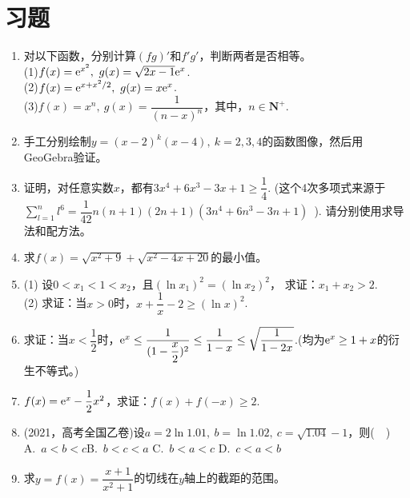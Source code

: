 
\section{习题} 
\begin{enumerate}[label={\textbf{\arabic*.}},leftmargin=
    \inteval{\myenumleftmargin}pt]
\item 对以下函数，分别计算$ (fg)' $和$ f'g' $，判断两者是否相等。\\
(1)$ f(x)=\e^{x^2},\ g(x)=\sqrt{2x-1}\e^x $.\\
(2)$ f(x)=\e^{x+x^2/2},\ g(x)=x\e^x $. \\
(3)$ f(x)=x^n,\ g(x)=\dfrac{1}{(n-x)^n} $，其中，$ n\in \textbf{N}^+ $.

\item 手工分别绘制$ y=(x-2)^k(x-4),\ k=2,3,4 $的函数图像，然后用GeoGebra验证。

\item 证明，对任意实数$ x $，都有$ 3x^4+6x^3-3x+1\geq \dfrac{1}{4} $.
(这个4次多项式来源于$ \sum\limits_{l=1}^{n} l^6=
\dfrac{1}{42}n(n+1)(2n+1)(3n^4+6n^3-3n+1) $\ ). 
请分别使用求导法和配方法。

\item 求$ f(x)=\sqrt{x^2+9}+\sqrt{x^2-4x+20} $的最小值。

\item 
(1) 设$ 0<x_1<1<x_2 $，且$ (\ln x_1)^2=(\ln x_2)^2 $，
求证：$ x_1+x_2>2 $. \\
(2) 求证：当$x>0$时，$ x+\dfrac{1}{x}-2\geq (\ln x)^2 $. 

\item 求证：当$ x<\dfrac{1}{2} $时，$ \mathrm{e}^x\leq \dfrac{1}{(1-\dfrac{x}{2})^2}
\leq \dfrac{1}{1-x}\leq \sqrt{\dfrac{1}{1-2x}} $.(均为$ \mathrm{e}^x\geq 1+x $的衍生不等式。)

\item $ f(x)=\mathrm{e}^x-\dfrac{1}{2}x^2 $，求证：$ f(x)+f(-x)\geq 2 $. 

\item (2021，高考全国乙卷)设$a=2\ln1.01,\ b=\ln1.02,\ c=\sqrt{1.04}-1 $，则(\ \ ) \\
A.\ $a<b<c$\q\q B.\ $b<c<a$ \q\q C.\ $b<a<c$ \q\q D.\ $c<a<b$ 

\item 求$ y=f(x)=\dfrac{x+1}{x^2+1} $的切线在$ y $轴上的截距的范围。


\end{enumerate}
